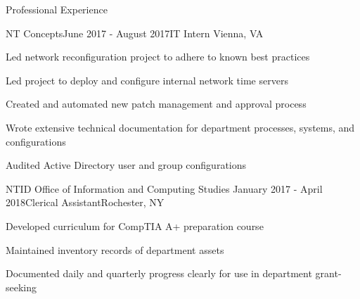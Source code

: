 \documentclass{resume} %
\begin{document}
\begin{rSection}{Professional Experience}

    \begin{rSubsection}{NT Concepts}{June 2017 - August 2017}{IT Intern}
        {Vienna, VA}
    \item Led network reconfiguration project to adhere to known best practices
    \item Led project to deploy and configure internal network time servers
    \item Created and automated new patch management and approval process
    \item Wrote extensive technical documentation for department processes,
        systems, and configurations
    \item Audited Active Directory user and group configurations
    \end{rSubsection}


    \begin{rSubsection}{NTID Office of Information and Computing Studies}
        {January 2017 - April 2018}{Clerical Assistant}{Rochester, NY}
    \item Developed curriculum for CompTIA A+ preparation course
    \item Maintained inventory records of department assets
    \item Documented daily and quarterly progress clearly for use in department
        grant-seeking
    \end{rSubsection}

\end{rSection}

\end{document}
